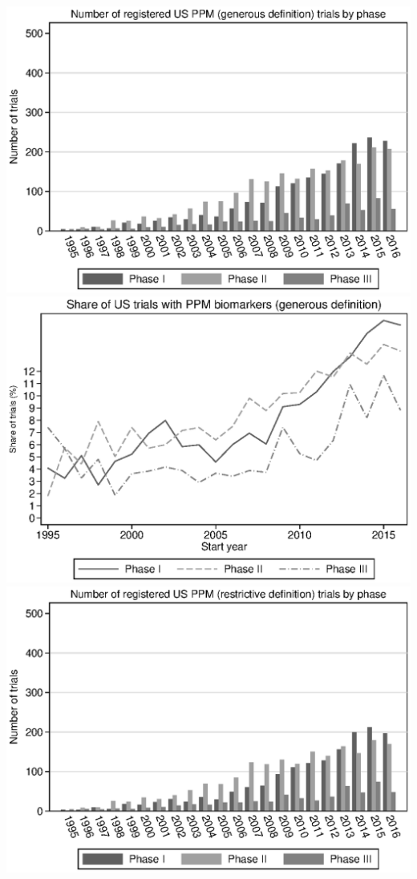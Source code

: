 \includegraphics{../figures/A03a-g_ppm_count_by_phase_us.eps}
\includegraphics{../figures/A03b-g_ppm_share_by_phase_us.eps}
\includegraphics{../figures/A03c-r_ppm_count_by_phase_us.eps}
